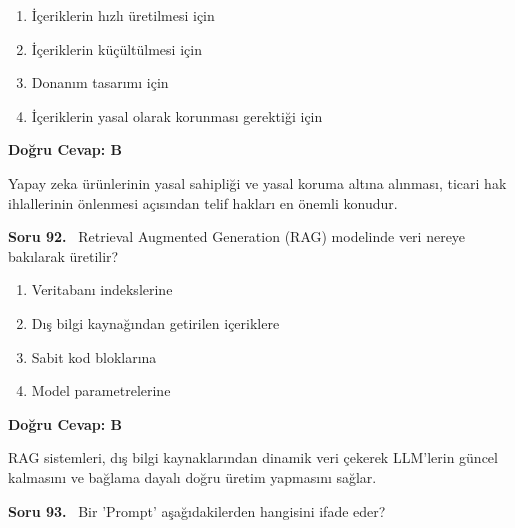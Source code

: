 \documentclass[11pt,a4paper,openany]{book}
\begin{document}
\begin{enumerate}[label=\Alph*), leftmargin=25pt, topsep=4pt, itemsep=2pt]
        \item İçeriklerin hızlı üretilmesi için
        \item İçeriklerin küçültülmesi için
        \item Donanım tasarımı için
        \item İçeriklerin yasal olarak korunması gerektiği için
\end{enumerate}

\vspace{4pt}
\begin{tcolorbox}[title=Cevap ve Açıklama, colback=gray!3!white, colframe=primarycolor!90!black, arc=2mm, fonttitle=\bfseries\sffamily, top=6pt, bottom=6pt]
    \textbf{Doğru Cevap: B}

    \vspace{2pt}
    Yapay zeka ürünlerinin yasal sahipliği ve yasal koruma altına alınması, ticari hak ihlallerinin önlenmesi açısından telif hakları en önemli konudur.
\end{tcolorbox}
\vspace{10pt}
\needspace{5cm}
\vspace{8pt}
\noindent\textbf{\large\sffamily Soru 92.} \ Retrieval Augmented Generation (RAG) modelinde veri nereye bakılarak üretilir?

\begin{enumerate}[label=\Alph*), leftmargin=25pt, topsep=4pt, itemsep=2pt]
        \item Veritabanı indekslerine
        \item Dış bilgi kaynağından getirilen içeriklere
        \item Sabit kod bloklarına
        \item Model parametrelerine
\end{enumerate}

\vspace{4pt}
\begin{tcolorbox}[title=Cevap ve Açıklama, colback=gray!3!white, colframe=primarycolor!90!black, arc=2mm, fonttitle=\bfseries\sffamily, top=6pt, bottom=6pt]
    \textbf{Doğru Cevap: B}

    \vspace{2pt}
    RAG sistemleri, dış bilgi kaynaklarından dinamik veri çekerek LLM'lerin güncel kalmasını ve bağlama dayalı doğru üretim yapmasını sağlar.
\end{tcolorbox}
\vspace{10pt}
\needspace{5cm}
\vspace{8pt}
\noindent\textbf{\large\sffamily Soru 93.} \ Bir 'Prompt' aşağıdakilerden hangisini ifade eder?
\end{document}

